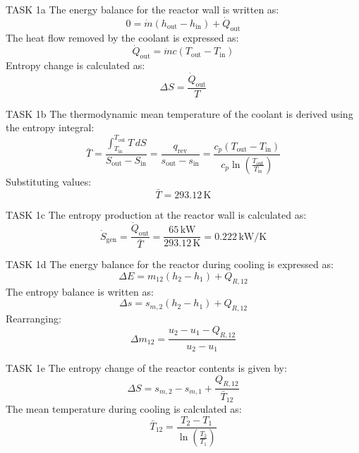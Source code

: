 TASK 1a  
The energy balance for the reactor wall is written as:  
\[
0 = \dot{m} (h_{\text{out}} - h_{\text{in}}) + \dot{Q}_{\text{out}}
\]  
The heat flow removed by the coolant is expressed as:  
\[
\dot{Q}_{\text{out}} = \dot{m} c (T_{\text{out}} - T_{\text{in}})
\]  
Entropy change is calculated as:  
\[
\Delta S = \frac{\dot{Q}_{\text{out}}}{T}
\]  

TASK 1b  
The thermodynamic mean temperature of the coolant is derived using the entropy integral:  
\[
\bar{T} = \frac{\int_{T_{\text{in}}}^{T_{\text{out}}} T \, dS}{S_{\text{out}} - S_{\text{in}}} = \frac{q_{\text{rev}}}{s_{\text{out}} - s_{\text{in}}} = \frac{c_p (T_{\text{out}} - T_{\text{in}})}{c_p \ln \left( \frac{T_{\text{out}}}{T_{\text{in}}} \right)}
\]  
Substituting values:  
\[
\bar{T} = 293.12 \, \text{K}
\]  

TASK 1c  
The entropy production at the reactor wall is calculated as:  
\[
\dot{S}_{\text{gen}} = \frac{\dot{Q}_{\text{out}}}{\bar{T}} = \frac{65 \, \text{kW}}{293.12 \, \text{K}} = 0.222 \, \text{kW/K}
\]  

TASK 1d  
The energy balance for the reactor during cooling is expressed as:  
\[
\Delta E = m_{12} (h_2 - h_1) + Q_{R,12}
\]  
The entropy balance is written as:  
\[
\Delta s = s_{m,2} (h_2 - h_1) + Q_{R,12}
\]  
Rearranging:  
\[
\Delta m_{12} = \frac{u_2 - u_1 - Q_{R,12}}{u_2 - u_1}
\]  

TASK 1e  
The entropy change of the reactor contents is given by:  
\[
\Delta S = s_{m,2} - s_{m,1} + \frac{Q_{R,12}}{\bar{T}_{12}}
\]  
The mean temperature during cooling is calculated as:  
\[
\bar{T}_{12} = \frac{T_2 - T_1}{\ln \left( \frac{T_2}{T_1} \right)}
\]